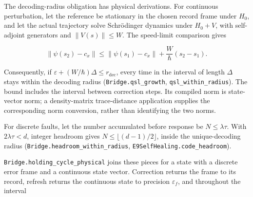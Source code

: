 \documentclass[
]{article}
\begin{document}
The decoding-radius obligation has physical derivations. For continuous
perturbation, let the reference be stationary in the chosen record frame
under \(H_0\), and let the actual trajectory solve Schrödinger dynamics
under \(H_0+V\), with self-adjoint generators and \(\|V(s)\|\le W\). The
speed-limit comparison gives

\[
\|\psi(s_2)-c_x\|\le\|\psi(s_1)-c_x\|+\frac W\hbar(s_2-s_1).
\]

Consequently, if \(\varepsilon+(W/\hbar)\Delta\le r_{\mathrm{dec}}\),
every time in the interval of length \(\Delta\) stays within the
decoding radius
(\texttt{B\allowbreak{}r\allowbreak{}i\allowbreak{}d\allowbreak{}g\allowbreak{}e\allowbreak{}.\allowbreak{}q\allowbreak{}s\allowbreak{}l\allowbreak{}\_\allowbreak{}g\allowbreak{}r\allowbreak{}o\allowbreak{}w\allowbreak{}t\allowbreak{}h},
\texttt{q\allowbreak{}s\allowbreak{}l\allowbreak{}\_\allowbreak{}w\allowbreak{}i\allowbreak{}t\allowbreak{}h\allowbreak{}i\allowbreak{}n\allowbreak{}\_\allowbreak{}r\allowbreak{}a\allowbreak{}d\allowbreak{}i\allowbreak{}u\allowbreak{}s}).
The bound includes the interval between correction steps. Its compiled
norm is state-vector norm; a density-matrix trace-distance application
supplies the corresponding norm conversion, rather than identifying the
two norms.

For discrete faults, let the number accumulated before response be
\(N\le\lambda\tau\). With \(2\lambda\tau<d\), integer headroom gives
\(N\le\lfloor(d-1)/2\rfloor\), inside the unique-decoding radius
(\texttt{B\allowbreak{}r\allowbreak{}i\allowbreak{}d\allowbreak{}g\allowbreak{}e\allowbreak{}.\allowbreak{}h\allowbreak{}e\allowbreak{}a\allowbreak{}d\allowbreak{}r\allowbreak{}o\allowbreak{}o\allowbreak{}m\allowbreak{}\_\allowbreak{}w\allowbreak{}i\allowbreak{}t\allowbreak{}h\allowbreak{}i\allowbreak{}n\allowbreak{}\_\allowbreak{}r\allowbreak{}a\allowbreak{}d\allowbreak{}i\allowbreak{}u\allowbreak{}s},
\texttt{E\allowbreak{}9\allowbreak{}S\allowbreak{}e\allowbreak{}l\allowbreak{}f\allowbreak{}H\allowbreak{}e\allowbreak{}a\allowbreak{}l\allowbreak{}i\allowbreak{}n\allowbreak{}g\allowbreak{}.\allowbreak{}c\allowbreak{}o\allowbreak{}d\allowbreak{}e\allowbreak{}\_\allowbreak{}h\allowbreak{}e\allowbreak{}a\allowbreak{}d\allowbreak{}r\allowbreak{}o\allowbreak{}o\allowbreak{}m}).

\texttt{B\allowbreak{}r\allowbreak{}i\allowbreak{}d\allowbreak{}g\allowbreak{}e\allowbreak{}.\allowbreak{}h\allowbreak{}o\allowbreak{}l\allowbreak{}d\allowbreak{}i\allowbreak{}n\allowbreak{}g\allowbreak{}\_\allowbreak{}c\allowbreak{}y\allowbreak{}c\allowbreak{}l\allowbreak{}e\allowbreak{}\_\allowbreak{}p\allowbreak{}h\allowbreak{}y\allowbreak{}s\allowbreak{}i\allowbreak{}c\allowbreak{}a\allowbreak{}l}
joins these pieces for a state with a discrete error frame and a
continuous state vector. Correction returns the frame to its record,
refresh returns the continuous state to precision \(\varepsilon_f\), and
throughout the interval
\end{document}

